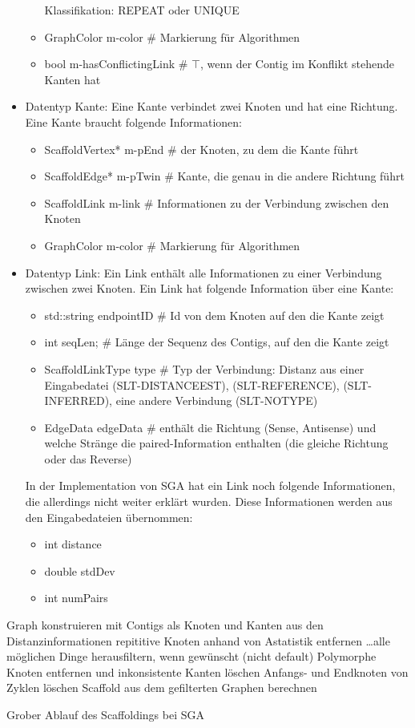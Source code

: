 \documentclass[a4paper,10pt,parskip]{scrartcl}
\begin{document}
\begin{itemize}
\begin{itemize}
    Klassifikation: REPEAT oder UNIQUE
  \item GraphColor m-color \# Markierung für Algorithmen
  \item bool m-hasConflictingLink \# $\top$, wenn der Contig im
    Konflikt stehende Kanten hat
  \end{itemize}
\item Datentyp Kante: Eine Kante verbindet zwei Knoten und hat eine
  Richtung. Eine Kante braucht folgende Informationen:
  \begin{itemize}
  \item ScaffoldVertex* m-pEnd \# der Knoten, zu dem die Kante führt
  \item ScaffoldEdge* m-pTwin \# Kante, die genau in die andere
    Richtung führt
  \item ScaffoldLink m-link \# Informationen zu der Verbindung
    zwischen den Knoten
  \item GraphColor m-color \# Markierung für Algorithmen
  \end{itemize}
\item Datentyp Link: Ein Link enthält alle Informationen zu einer
  Verbindung zwischen zwei Knoten. Ein Link hat folgende Information
  über eine Kante:
  \begin{itemize}
  \item std::string endpointID \# Id von dem Knoten auf den die Kante zeigt
  \item int seqLen; \# Länge der Sequenz des Contigs, auf den die Kante zeigt
  \item ScaffoldLinkType type \# Typ der Verbindung: Distanz aus einer
    Eingabedatei (SLT-DISTANCEEST), (SLT-REFERENCE), (SLT-INFERRED), eine
    andere Verbindung (SLT-NOTYPE)
  \item EdgeData edgeData \# enthält die Richtung (Sense, Antisense)
    und welche Stränge die paired-Information enthalten (die gleiche
    Richtung oder das Reverse)
  \end{itemize}
  In der Implementation von SGA hat ein Link noch folgende
  Informationen, die allerdings nicht weiter erklärt wurden. Diese
  Informationen werden aus den Eingabedateien übernommen:
  \begin{itemize}
  \item int distance
  \item double stdDev
  \item int numPairs
  \end{itemize}
\end{itemize}



\begin{algorithm}[H]
  \SetAlgoLined
  Graph konstruieren mit Contigs als Knoten und Kanten aus den Distanzinformationen\;
  repititive Knoten anhand von Astatistik entfernen\;
  \dots alle möglichen Dinge herausfiltern, wenn gewünscht (nicht default)\;
  Polymorphe Knoten entfernen und inkonsistente Kanten löschen\;
  Anfangs- und Endknoten von Zyklen löschen\;
  Scaffold aus dem gefilterten Graphen berechnen\;
  \caption{Grober Ablauf des Scaffoldings bei SGA}
\end{algorithm}
\end{document}
